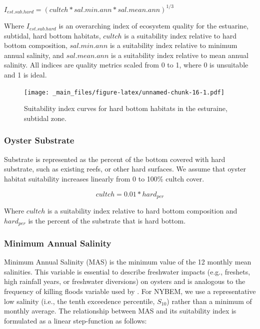 \documentclass[
]{book}
\begin{document}
\(I_{est.sub.hard} = {(cultch * sal.min.ann * sal.mean.ann)}^{1/3}\)

Where \(I_{est.sub.hard}\) is an overarching index of ecosystem quality for the estuarine, subtidal, hard bottom habitats, \(cultch\) is a suitability index relative to hard bottom composition, \(sal.min.ann\) is a suitability index relative to minimum annual salinity, and \(sal.mean.ann\) is a suitability index relative to mean annual salinity. All indices are quality metrics scaled from 0 to 1, where 0 is unsuitable and 1 is ideal.

\begin{figure}
\centering
\texttt{[image: \_main\_files/figure-latex/unnamed-chunk-16-1.pdf]}
\caption{\label{fig:unnamed-chunk-16}Suitability index curves for hard bottom habitats in the esturaine, subtidal zone.}
\end{figure}

\hypertarget{oyster-substrate}{%
\subsubsection{Oyster Substrate}\label{oyster-substrate}}

Substrate is represented as the percent of the bottom covered with hard substrate, such as existing reefs, or other hard surfaces. We assume that oyster habitat suitability increases linearly from 0 to 100\% cultch cover.

\[cultch = 0.01*hard_{per}\]

Where \(cultch\) is a suitability index relative to hard bottom composition and \(hard_{per}\) is the percent of the substrate that is hard bottom.

\hypertarget{minimum-annual-salinity}{%
\subsubsection{Minimum Annual Salinity}\label{minimum-annual-salinity}}

Minimum Annual Salinity (MAS) is the minimum value of the 12 monthly mean salinities. This variable is essential to describe freshwater impacts (e.g., freshets, high rainfall years, or freshwater diversions) on oysters and is analogous to the frequency of killing floods variable used by \citet{cake_habitat_1983}. For NYBEM, we use a representative low salinity (i.e., the tenth exceedence percentile, \(S_{10}\)) rather than a minimum of monthly average. The relationship between MAS and its suitability index is formulated as a linear step-function as follows:
\end{document}
